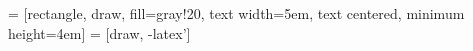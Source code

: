 \usepackage{setspace}

\usepackage{moreverb}

\usepackage{minted}
\usepackage{tikz}
\usetikzlibrary{shapes, arrows}

 = [rectangle, draw, fill=gray!20, 
    text width=5em, text centered, minimum height=4em]
 = [draw, -latex']

\newcommand{\codigofuente}{\inputminted[linenos,numberblanklines,breaklines,frame=lines]}

\newcommand{\extractocodigo}{\minted[linenos,numberblanklines,breaklines,frame=lines]}

\usepackage{tipa} %
\usepackage{longtable} %
\usepackage{colortbl}
\usepackage{acronym}  %